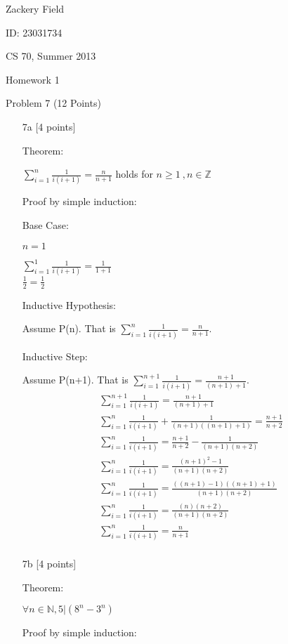 \documentclass[11pt,letterpaper]{article}
\begin{document}
Zackery Field

ID: 23031734

CS 70, Summer 2013

Homework 1 

Problem 7 (12 Points)
\bigskip

\begin{enumerate}

\item[7a] [4 points] 

Theorem:

$\sum\limits_{i=1}^{n} \frac{1}{i(i+1)} = \frac{n}{n+1}$ holds for $n \geq 1 \:, n \in \mathbb{Z} $

Proof by simple induction:

Base Case:

$n = 1$

$\sum\limits_{i=1}^{1} \frac{1}{i(i+1)} = \frac{1}{1+1}$\\
$\frac{1}{2} = \frac{1}{2}$

Inductive Hypothesis:

Assume P(n). That is $\sum\limits_{i=1}^{n} \frac{1}{i(i+1)} = \frac{n}{n+1}$.

Inductive Step:

Assume P(n+1). That is $\sum\limits_{i=1}^{n+1} \frac{1}{i(i+1)} = \frac{n+1}{(n+1)+1}$.
\begin{eqnarray}
\sum\limits_{i=1}^{n+1} \frac{1}{i(i+1)} = \frac{n+1}{(n+1)+1}\\
\sum\limits_{i=1}^{n} \frac{1}{i(i+1)} + \frac{1}{(n+1)((n+1) + 1)} = \frac{n+1}{n+2}\\
\sum\limits_{i=1}^{n} \frac{1}{i(i+1)} =  \frac{n+1}{n+2}  - \frac{1}{(n+1)(n+2)}\\
\sum\limits_{i=1}^{n} \frac{1}{i(i+1)} =  \frac{(n+1)^2 - 1}{(n+1)(n+2)}\\
\sum\limits_{i=1}^{n} \frac{1}{i(i+1)} =  \frac{((n+1) -1)((n+ 1) + 1)}{(n+1)(n+2)}\\
\sum\limits_{i=1}^{n} \frac{1}{i(i+1)} =  \frac{(n)(n+2)}{(n+1)(n+2)}\\
\sum\limits_{i=1}^{n} \frac{1}{i(i+1)} =  \frac{n}{n+1}\\
\end{eqnarray}

\item[7b] [4 points]

Theorem:

$\forall n \in \mathbb{N}, 5 | (8^n - 3^n)$

Proof by simple induction:


\end{enumerate}
\end{document}
